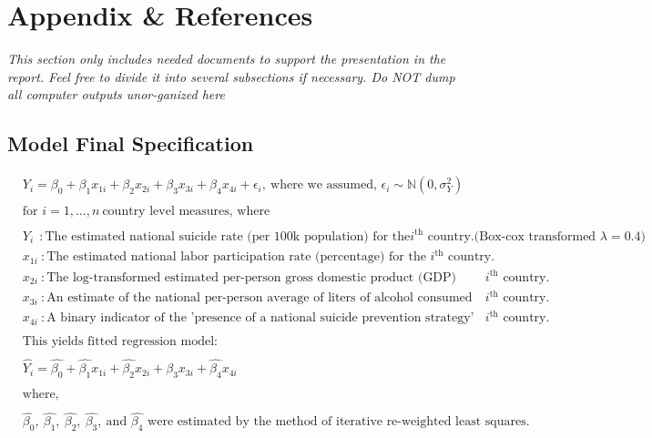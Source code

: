 \documentclass[]{article}
\begin{document}
\section{Appendix \& References}\label{appendix-references}

\emph{This section only includes needed documents to support the
presentation in the report. Feel free to divide it into several
subsections if necessary. Do NOT dump all computer outputs unor-ganized
here}

\subsection{Model Final Specification}\label{model-final-specification}

\[
\begin{aligned}
& Y_i = \beta_0 + \beta_1 x_{1i} + \beta_2 x_{2i} + \beta_3 x_{3i} + \beta_4 x_{4i}  + \epsilon_i,\ \text{where we assumed, } \epsilon_i \sim \mathbb{N}(0,\sigma_{Y}^2) \\
&\\
&\text{for } i = 1,...,n \ \text{country level measures, where} \\
& \\
& Y_i \ \ : \text{The estimated national suicide rate (per 100k population) for the} i^{\text{th}} \text{ country.(Box-cox transformed $\lambda = 0.4$)} \\
& x_{1i}\ : \text{The estimated national labor participation rate (percentage) for the } i^{\text{th}} \text{ country.}\\
& x_{2i}\ : \text{The log-transformed estimated per-person gross domestic product (GDP) (income) for the } i^{\text{th}} \text{ country.}\\
& x_{3i}\ : \text{An estimate of the national per-person average of liters of alcohol consumed annually for the } i^{\text{th}} \text{ country.}\\
& x_{4i}\ : \text{A binary indicator of the 'presence of a national suicide prevention strategy' in 2019 for the } i^{\text{th}} \text{ country.}\\
& \\
& \text{This yields fitted regression model: } \\
& \\
& \hat{Y_i} = \hat{\beta_0} + \hat{\beta_1} x_{1i} + \hat{\beta_2} x_{2i} + \hat{\beta_3} x_{3i} + \hat{\beta_4} x_{4i} \\
& \\
& \text{where, } \\
& \\
& \hat{\beta_0},\ \hat{\beta_1},\ \hat{\beta_2},\ \hat{\beta_3}, \ \text{and } \hat{\beta_4} \text{ were estimated by the method of iterative re-weighted least squares.} \\
\end{aligned}
\]
\end{document}
